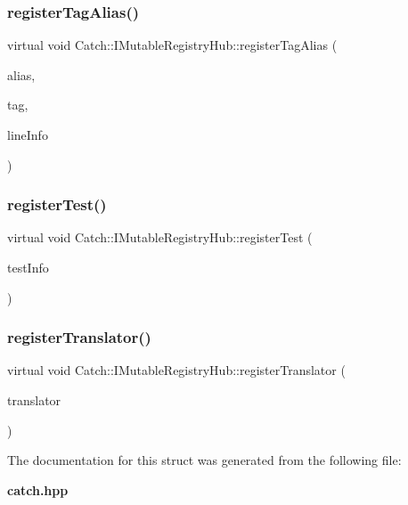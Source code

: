 \subsubsection{register\+Tag\+Alias()}
{\footnotesize\ttfamily virtual void Catch\+::\+I\+Mutable\+Registry\+Hub\+::register\+Tag\+Alias (\begin{DoxyParamCaption}\item[{std\+::string const \&}]{alias,  }\item[{std\+::string const \&}]{tag,  }\item[{\textbf{ Source\+Line\+Info} const \&}]{line\+Info }\end{DoxyParamCaption})\hspace{0.3cm}{\ttfamily [pure virtual]}}

\mbox{\label{struct_catch_1_1_i_mutable_registry_hub_a11b85c6744d88c9f83fe16ad4a8dd451}} 
\subsubsection{register\+Test()}
{\footnotesize\ttfamily virtual void Catch\+::\+I\+Mutable\+Registry\+Hub\+::register\+Test (\begin{DoxyParamCaption}\item[{\textbf{ Test\+Case} const \&}]{test\+Info }\end{DoxyParamCaption})\hspace{0.3cm}{\ttfamily [pure virtual]}}

\mbox{\label{struct_catch_1_1_i_mutable_registry_hub_ae6825365102693cf7707db022a2c2b49}} 
\subsubsection{register\+Translator()}
{\footnotesize\ttfamily virtual void Catch\+::\+I\+Mutable\+Registry\+Hub\+::register\+Translator (\begin{DoxyParamCaption}\item[{const \textbf{ I\+Exception\+Translator} $\ast$}]{translator }\end{DoxyParamCaption})\hspace{0.3cm}{\ttfamily [pure virtual]}}



The documentation for this struct was generated from the following file\+:\begin{DoxyCompactItemize}
\item 
\textbf{ catch.\+hpp}\end{DoxyCompactItemize}
